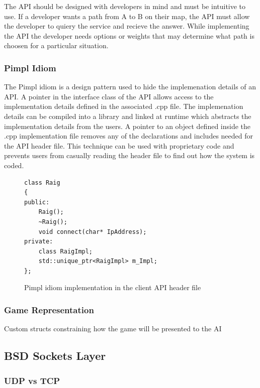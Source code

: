 \documentclass[12pt,a4paper,titlepage]{article}
\begin{document}
The API should be designed with developers in mind and must be intuitive to use. If a developer wants a path from A to B on their map, the API must allow the developer to quiery the service and recieve the answer. While implementing the API the developer needs options or weights that may determine what path is choosen for a particular situation. 

\subsubsection{Pimpl Idiom}

The Pimpl idiom is a design pattern used to hide the implemenation details of an API. A pointer in the interface class of the API allows access to the implementation details defined in the associated .cpp file. The implemenation details can be compiled into a library and linked at runtime which abstracts the implementation details from the users. A pointer to an object defined inside the .cpp implementation file removes any of the declarations and includes needed for the API header file. This technique can be used with proprietary code and prevents users from casually reading the header file to find out how the system is coded. 

\begin{figure}[H]
\begin{lstlisting}
class Raig
{
public:
	Raig();
	~Raig();
	void connect(char* IpAddress);
private:
	class RaigImpl; 
	std::unique_ptr<RaigImpl> m_Impl;
};
\end{lstlisting}
	\caption{Pimpl idiom implementation in the client API header file}
	\label{code:pimplidiom}
\end{figure}



\subsubsection{Game Representation}

Custom structs constraining how the game will be presented to the AI


\subsection{BSD Sockets Layer}
\label{section:networklayer}

\subsubsection{UDP vs TCP}
\end{document}
